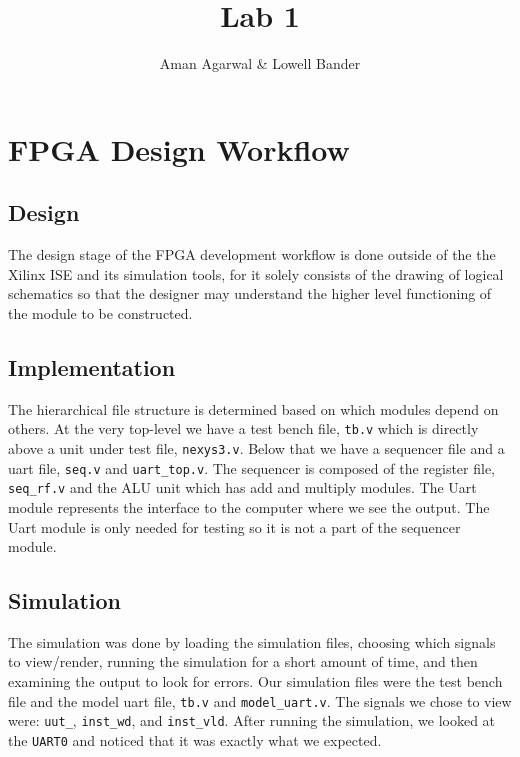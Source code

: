 \documentclass[]{article}
\newcommand{\subtitle}[1]{%
  \posttitle{%
    \par\end{center}
    \begin{center}\large#1\end{center}
    \vskip0.5em}%
}
\begin{document}
\title{Lab 1}
\subtitle{CS M152A}
\author{Aman Agarwal \& Lowell Bander}

\maketitle
\tableofcontents
\newpage

\section{FPGA Design Workflow}

\subsection{Design}

The design stage of the FPGA development workflow is done outside of the the Xilinx ISE and its simulation tools, for it solely consists of the drawing of logical schematics so that the designer may understand the higher level functioning of the module to be constructed.

\subsection{Implementation}

The hierarchical file structure is determined based on which modules depend on others. At the very top-level we have a test bench file, \texttt{tb.v} which is directly above a unit under test file, \texttt{nexys3.v}. Below that we have a sequencer file and a uart file, \texttt{seq.v} and \texttt{uart\_top.v}. The sequencer is composed of the register file, \texttt{seq\_rf.v} and the ALU unit which has add and multiply modules. The Uart module represents the interface to the computer where we see the output. The Uart module is only needed for testing so it is not a part of the sequencer module.

\subsection{Simulation}

The simulation was done by loading the simulation files, choosing which signals to view/render, running the simulation for a short amount of time, and then examining the output to look for errors. Our simulation files were the test bench file and the model uart file, \texttt{tb.v} and \texttt{model\_uart.v}. The signals we chose to view were: \texttt{uut\_}, \texttt{inst\_wd}, and \texttt{inst\_vld}. After running the simulation, we looked at the \texttt{UART0} and noticed that it was exactly what we expected.
\end{document}
